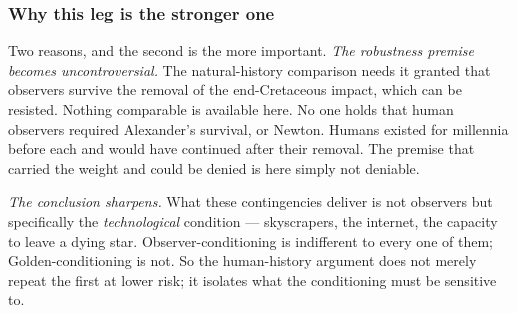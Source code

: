 
\subsubsection{Why this leg is the stronger one}
\label{gc:subsub:strongerleg}

Two reasons, and the second is the more important. \emph{The robustness premise becomes uncontroversial.} The natural-history
comparison needs it granted that observers survive the removal of the
end-Cretaceous impact, which can be resisted. Nothing comparable is
available here. No one holds that human observers required Alexander's
survival, or Newton. Humans existed for
millennia before each and would have continued after their removal. The
premise that carried the weight and could be denied is here simply not
deniable.

\emph{The conclusion sharpens.} What these contingencies deliver is not
observers but specifically the \emph{technological} condition ---
skyscrapers, the internet, the capacity to leave a dying star.
Observer-conditioning is indifferent to every one of them;
Golden-conditioning is not. So the human-history argument does not merely repeat
the first at lower risk; it isolates what the conditioning must be
sensitive to.

